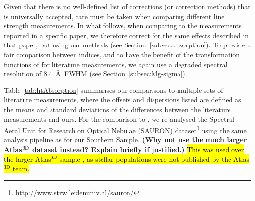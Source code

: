 \documentclass[a4paper,fleqn,usenatbib]{mnras}
\DeclareRobustCommand{\added}[1]{{\sethlcolor{green}\hl{#1}}}
\begin{document}
Given that there is no well-defined list of corrections (or correction
methods) that is universally accepted, care must be taken when
comparing different line strength measurements. In what follows, when
comparing to the measurements reported in a specific paper, we
therefore correct for the same effects described in that paper, but
using our methods (see Section~\ref{subsec:absorption}). To provide a
fair comparison between indices, and to have the benefit of the
transformation functions of \citet{Vazdekis2010} for literature
measurements, we again use a degraded spectral resolution of
$8.4$~\AA\ FWHM (see Section~\ref{subsec:Mg-sigma}).

Table \ref{tab:litAbsorption} summarises our comparisons to multiple
sets of literature measurements, where the offsets and dispersions
listed are defined as the means and standard deviations of the
differences between the literature measurements and ours. For the
comparison to \citet{Vazdekis2010}, we re-analysed the Spectral Aeral
Unit for Research on Optical Nebulae (SAURON)
dataset\footnote{\url{http://www.strw.leidenuniv.nl/sauron/}}
\citep{Emsellem2004} using the same analysis pipeline as for our
Southern Sample. {\bf (Why not use the much larger Atlas$^{\rm 3D}$
  dataset instead? Explain briefly if justified.)} \added{This was used over the larger Atlas$^\text{3D}$ sample \citep{Cappellari2011}, as stellar populations were not published by the Atlas$^\text{3D}$ team.}
\end{document}

